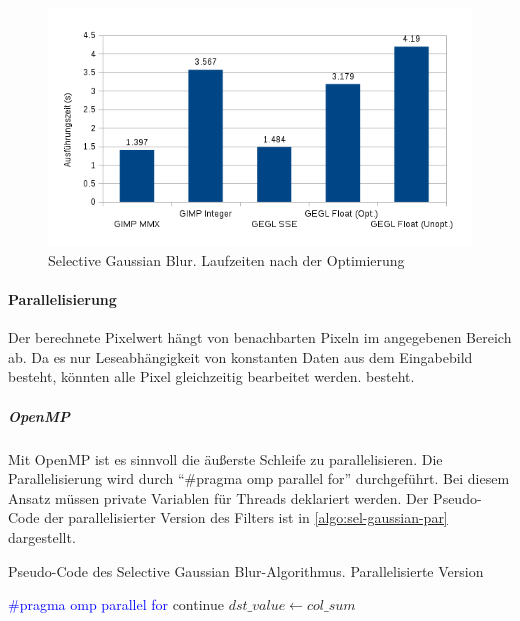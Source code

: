 \begin{figure}
\centering
\includegraphics[scale=0.75]{graphs/sgb-graph-2.png}
\caption{Selective Gaussian Blur. Laufzeiten nach der Optimierung}
\label{fig:sgb-graph-2}
\end{figure} 
 

\paragraph{Parallelisierung} 
Der berechnete Pixelwert hängt von benachbarten Pixeln im angegebenen Bereich ab. Da es nur Leseabhängigkeit von konstanten Daten aus dem Eingabebild besteht, könnten alle Pixel gleichzeitig bearbeitet werden.
besteht.

\subparagraph{OpenMP}
Mit OpenMP ist es sinnvoll die äußerste Schleife zu parallelisieren. Die Parallelisierung wird durch ``\#pragma omp parallel for'' durchgeführt.  Bei diesem Ansatz müssen private Variablen für Threads deklariert werden. Der Pseudo-Code der parallelisierter Version des Filters ist in \autoref{algo:sel-gaussian-par} dargestellt.

\begin{algorithm}[h]
\caption{Pseudo-Code des \glqq Selective Gaussian Blur\grqq-Algorithmus. Parallelisierte Version}
\label{algo:sel-gaussian-par}
\begin{algorithmic}[1]
\State \textcolor{blue}{\#pragma omp parallel for }
			\State continue
			\EndIf
				\EndIf
			\EndFor
		\EndFor
		\State $dst\_value \gets col\_sum$
	\EndFor
\EndFor	
\end{algorithmic}
\end{algorithm}
